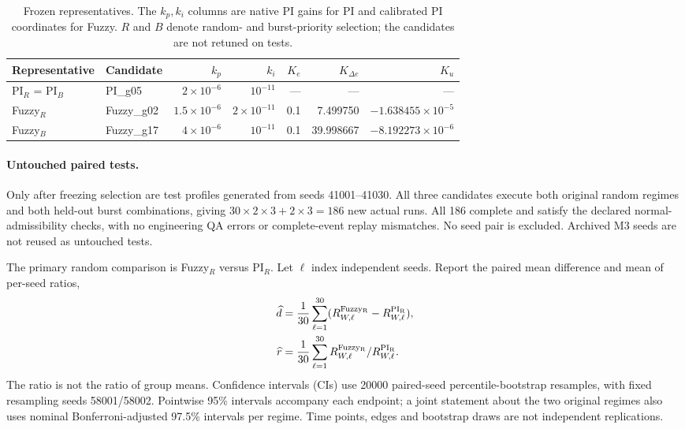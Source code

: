 \begin{table}[t]
\caption{Frozen representatives. The $k_p,k_i$ columns are native PI gains
for PI and calibrated PI coordinates for Fuzzy. $R$ and $B$ denote
random- and burst-priority selection; the candidates are not retuned on tests.}
\label{detail:tab:eval_selected_gains}
\centering
\begin{tabular}{@{}llrrrrr@{}}\toprule
Representative & Candidate & $k_p$ & $k_i$ & $K_e$ & $K_{\Delta e}$ & $K_u$\\\midrule
PI$_R$ = PI$_B$ & PI\_g05 & $2\times10^{-6}$ & $10^{-11}$ & --- & --- & ---\\
Fuzzy$_R$ & Fuzzy\_g02 & $1.5\times10^{-6}$ & $2\times10^{-11}$ & 0.1 & 7.499750 & $-1.638455\times10^{-5}$\\
Fuzzy$_B$ & Fuzzy\_g17 & $4\times10^{-6}$ & $10^{-11}$ & 0.1 & 39.998667 & $-8.192273\times10^{-6}$\\\bottomrule
\end{tabular}
\end{table}

\paragraph{Untouched paired tests.}
Only after freezing selection are test profiles generated from seeds
41001--41030. All three candidates execute both original random
regimes and both held-out burst combinations, giving
$30\times2\times3+2\times3=186$ new actual runs. All 186 complete
and satisfy the declared normal-admissibility checks, with no
engineering QA errors or complete-event replay mismatches. No seed
pair is excluded. Archived M3 seeds are not reused as untouched tests.

The primary random comparison is Fuzzy$_R$ versus PI$_R$. Let $\ell$
index independent seeds. Report the paired mean difference and mean
of per-seed ratios,
\begin{align}
 \widehat d&=\frac1{30}\sum_{\ell=1}^{30}
       (R_{W,\ell}^{\rm Fuzzy_R}-R_{W,\ell}^{\rm PI_R}),\nonumber\\
 \widehat r&=\frac1{30}\sum_{\ell=1}^{30}
       R_{W,\ell}^{\rm Fuzzy_R}/R_{W,\ell}^{\rm PI_R}.
 \label{detail:eq:eval_paired_ratio}
\end{align}
The ratio is not the ratio of group means. Confidence intervals (CIs)
use 20000 paired-seed percentile-bootstrap resamples, with fixed
resampling seeds 58001/58002. Pointwise 95\% intervals accompany
each endpoint; a joint statement about the two original regimes also
uses nominal Bonferroni-adjusted 97.5\% intervals per regime.
Time points, edges and bootstrap draws are not independent replications.

